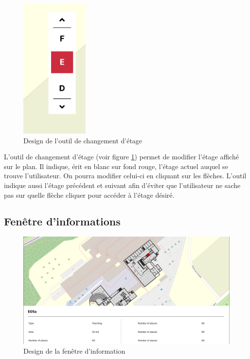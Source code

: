 \documentclass[
    iai, %
    il, %
]{heig-tb}
\begin{document}
\begin{figure}[h]
    \centering
    \includegraphics[scale=1]{designChangementEtage.png}
    \caption{Design de l'outil de changement d'étage}
    \label{fig:floorChange}
\end{figure}

L'outil de changement d'étage (voir figure \ref{fig:floorChange}) permet de modifier l'étage affiché sur le plan.
Il indique, érit en blanc sur fond rouge, l'étage actuel auquel se trouve l'utilisateur.
On pourra modifier celui-ci en cliquant sur les flèches.
L'outil indique aussi l'étage précédent et suivant
afin d'éviter que l'utilisateur ne sache pas sur quelle flèche cliquer pour accéder à l'étage désiré.

\subsection{Fenêtre d'informations}

\begin{figure}[h]
    \centering
    \includegraphics[scale=0.4]{designInfo.png}
    \caption{Design de la fenêtre d'information}
    \label{fig:infoPanel}
\end{figure}
\end{document}
